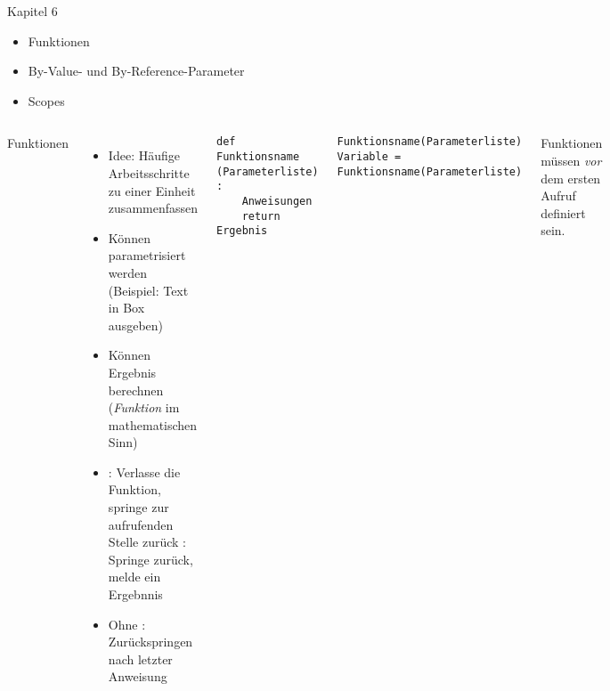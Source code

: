 \begin{frame}[fragile]{Kapitel 6}
%
\begin{itemize}
\item Funktionen
\item By-Value- und By-Reference-Parameter
\item Scopes
\end{itemize}
%
\end{frame}


\begin{frame}[fragile]
%
\begin{columns}[T]
\begin{Large}
{Funktionen}
\vspace{6pt}
\end{Large}
\begin{itemize}
\item Idee: Häufige Arbeitsschritte zu einer Einheit zusammenfassen
\item Können parametrisiert werden (Beispiel: Text in Box ausgeben)
\item Können Ergebnis berechnen (\Thus \emph{Funktion} im mathematischen Sinn)
\item {}: Verlasse die Funktion, springe zur aufrufenden Stelle zurück
: Springe zurück, melde ein Ergebnnis
\item Ohne : Zurückspringen nach letzter Anweisung
\end{itemize}
%
\begin{codebox}
\begin{verbatim}
def Funktionsname (Parameterliste) :
    Anweisungen
    return Ergebnis
\end{verbatim}
\end{codebox}
%
\begin{codebox}
\begin{verbatim}
Funktionsname(Parameterliste)
Variable = Funktionsname(Parameterliste)
\end{verbatim}
\end{codebox}
%
\begin{hintbox}[Reihenfolge]
Funktionen müssen \emph{vor} dem ersten Aufruf definiert sein.
\end{hintbox}
\end{columns}
%
\end{frame}

